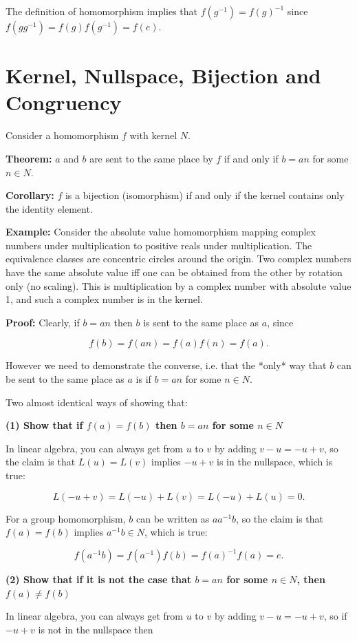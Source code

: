 The definition of homomorphism implies that $f(g^{-1}) = f(g)^{-1}$ since
$f(gg^{-1}) = f(g)f(g^{-1}) = f(e)$.

\section{Kernel, Nullspace, Bijection and Congruency}

Consider a homomorphism $f$ with kernel $N$.

\textbf{Theorem:} $a$ and $b$ are sent to the same place by $f$ if and only if
$b = an$ for some $n \in N$.

\textbf{Corollary:} $f$ is a bijection (isomorphism) if and only if the kernel
contains only the identity element.

\textbf{Example:} Consider the absolute value homomorphism mapping complex numbers
under multiplication to positive reals under multiplication. The equivalence
classes are concentric circles around the origin. Two complex numbers have the
same absolute value iff one can be obtained from the other by rotation only (no
scaling). This is multiplication by a complex number with absolute value 1, and
such a complex number is in the kernel.

\textbf{Proof:} Clearly, if $b = an$ then $b$ is sent to the same place as $a$,
since

$$
f(b) = f(an) = f(a)f(n) = f(a).
$$

However we need to demonstrate the converse, i.e. that the *only* way that $b$
can be sent to the same place as $a$ is if $b=an$ for some $n \in N$.

Two almost identical ways of showing that:

\textbf{(1) Show that if $f(a) = f(b)$ then $b = an$ for some $n \in N$}

In linear algebra, you can always get from $u$ to $v$ by adding $v - u = -u +
v$, so the claim is that $L(u) = L(v)$ implies $-u + v$ is in the nullspace,
which is true:

$$
L(-u + v) = L(-u) + L(v) = L(-u) + L(u) = 0.
$$

For a group homomorphism, $b$ can be written as $aa^{-1}b$, so the claim is
that $f(a) = f(b)$ implies $a^{-1}b \in N$, which is true:

$$
f(a^{-1}b) = f(a^{-1})f(b) = f(a)^{-1}f(a) = e.
$$

\textbf{(2) Show that if it is not the case that $b = an$ for some $n \in N$, then $f(a) \neq f(b)$}

In linear algebra, you can always get from $u$ to $v$ by adding $v - u = -u + v$,
so if $-u + v$ is not in the nullspace then

